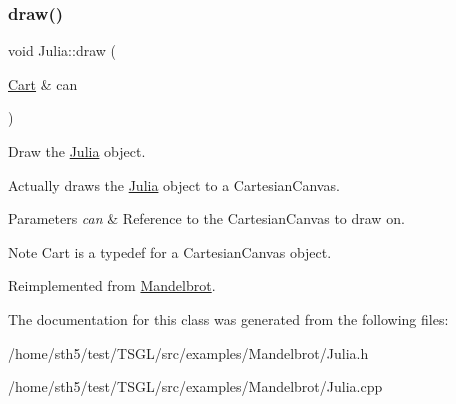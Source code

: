 \subsubsection{\texorpdfstring{draw()}{draw()}}
{\footnotesize\ttfamily void Julia\+::draw (\begin{DoxyParamCaption}\item[{\hyperlink{classtsgl_1_1_cartesian_canvas}{Cart} \&}]{can }\end{DoxyParamCaption})\hspace{0.3cm}{\ttfamily [virtual]}}



Draw the \hyperlink{class_julia}{Julia} object. 

Actually draws the \hyperlink{class_julia}{Julia} object to a Cartesian\+Canvas. 
\begin{DoxyParams}{Parameters}
{\em can} & Reference to the Cartesian\+Canvas to draw on. \\
\hline
\end{DoxyParams}
\begin{DoxyNote}{Note}
Cart is a typedef for a Cartesian\+Canvas object. 
\end{DoxyNote}


Reimplemented from \hyperlink{class_mandelbrot_ab7918e4de8f00f73290f110ca7a6cffd}{Mandelbrot}.



The documentation for this class was generated from the following files\+:\begin{DoxyCompactItemize}
\item 
/home/sth5/test/\+T\+S\+G\+L/src/examples/\+Mandelbrot/Julia.\+h\item 
/home/sth5/test/\+T\+S\+G\+L/src/examples/\+Mandelbrot/Julia.\+cpp\end{DoxyCompactItemize}
